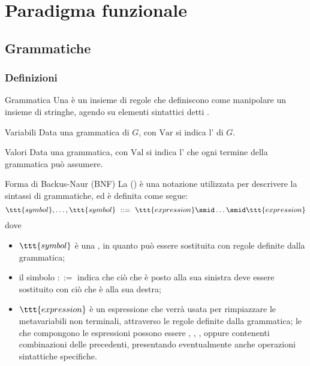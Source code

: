 \documentclass[a4paper, 12pt]{report}
\begin{document}
    \chapter{Paradigma funzionale}

    \section{Grammatiche}
    
    \subsection{Definizioni}

    \begin{frameddefn}{Grammatica}
        Una  è un insieme di regole che definiscono come manipolare un insieme di stringhe, agendo su elementi sintattici detti .
    \end{frameddefn}

    \begin{frameddefn}{Variabili}
        Data una grammatica di $G$, con $\mathrm{Var}$ si indica l' di $G$.
    \end{frameddefn}

    \begin{frameddefn}{Valori}
        Data una grammatica, con $\mathrm{Val}$ si indica l' che ogni termine della grammatica può assumere.
    \end{frameddefn}

    \begin{frameddefn}{Forma di Backus-Naur (BNF)}
        La  () è una notazione utilizzata per descrivere la sintassi di grammatiche, ed è definita come segue: $$\ttt{symbol}, \ldots, \ttt{symbol} \ ::= \ \ttt{expression} \smid \ldots \smid \ttt{expression}$$ dove
        \begin{itemize}
            \item $\ttt{symbol}$ è una , in quanto può essere sostituita con regole definite dalla grammatica;
            \item il simbolo $::=$ indica che ciò che è posto alla sua sinistra deve essere sostituito con ciò che è alla sua destra;
            \item $\ttt{expression}$ è un espressione che verrà usata per rimpiazzare le metavariabili non terminali, attraverso le regole definite dalla grammatica; le  che compongono le espressioni possono essere , , , oppure  contenenti combinazioni delle precedenti, presentando eventualmente anche operazioni sintattiche specifiche.
        \end{itemize}
    \end{frameddefn}
\end{document}
